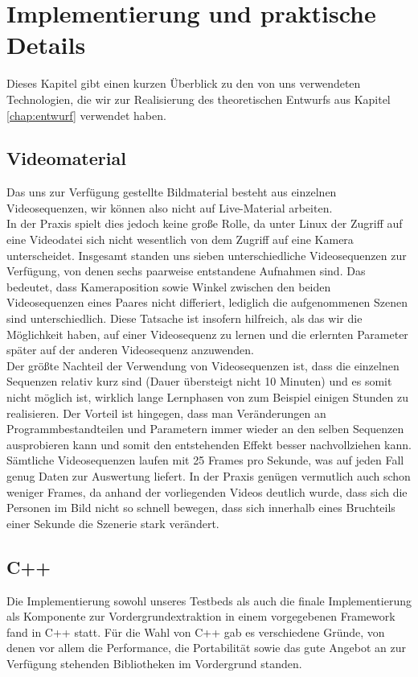 \section{Implementierung und praktische Details}
\label{chap:implementierung}

Dieses Kapitel gibt einen kurzen Überblick zu den von uns verwendeten Technologien, die wir zur Realisierung des theoretischen Entwurfs aus Kapitel \ref{chap:entwurf} verwendet haben.


\subsection{Videomaterial}
\label{sec:videomat}

Das uns zur Verfügung gestellte Bildmaterial besteht aus einzelnen Videosequenzen, wir können also nicht auf Live-Material arbeiten.\\

In der Praxis spielt dies jedoch keine große Rolle, da unter Linux der Zugriff auf eine Videodatei sich nicht wesentlich von dem Zugriff auf eine Kamera unterscheidet.
Insgesamt standen uns sieben unterschiedliche Videosequenzen zur Verfügung, von denen sechs paarweise entstandene Aufnahmen sind.
 Das bedeutet, dass Kameraposition sowie Winkel zwischen den beiden Videosequenzen eines Paares nicht differiert, lediglich die aufgenommenen Szenen sind unterschiedlich.
 Diese Tatsache ist insofern hilfreich, als das wir die Möglichkeit haben, auf einer Videosequenz zu lernen und die erlernten Parameter später auf der anderen Videosequenz anzuwenden.\\
Der größte Nachteil der Verwendung von Videosequenzen ist, dass die einzelnen Sequenzen relativ kurz sind (Dauer übersteigt nicht 10 Minuten) und es somit nicht möglich ist, wirklich lange Lernphasen von zum Beispiel einigen Stunden zu realisieren. Der Vorteil ist hingegen, dass man Veränderungen an Programmbestandteilen und Parametern immer wieder an den selben Sequenzen ausprobieren kann und somit den entstehenden Effekt besser nachvollziehen kann.\\
Sämtliche Videosequenzen laufen mit 25 Frames pro Sekunde, was auf jeden Fall genug Daten zur Auswertung liefert.
 In der Praxis genügen vermutlich auch schon weniger Frames, da anhand der vorliegenden Videos deutlich wurde, dass sich die Personen im Bild nicht so schnell bewegen, dass sich innerhalb eines Bruchteils einer Sekunde die Szenerie stark verändert.

\subsection{C++}
\label{sec:cpp}
Die Implementierung sowohl unseres Testbeds als auch die finale Implementierung als Komponente zur Vordergrundextraktion in einem vorgegebenen Framework fand in C++ statt.
 Für die Wahl von C++ gab es verschiedene Gründe, von denen vor allem die Performance, die Portabilität sowie das gute Angebot an zur Verfügung stehenden Bibliotheken im Vordergrund standen.

